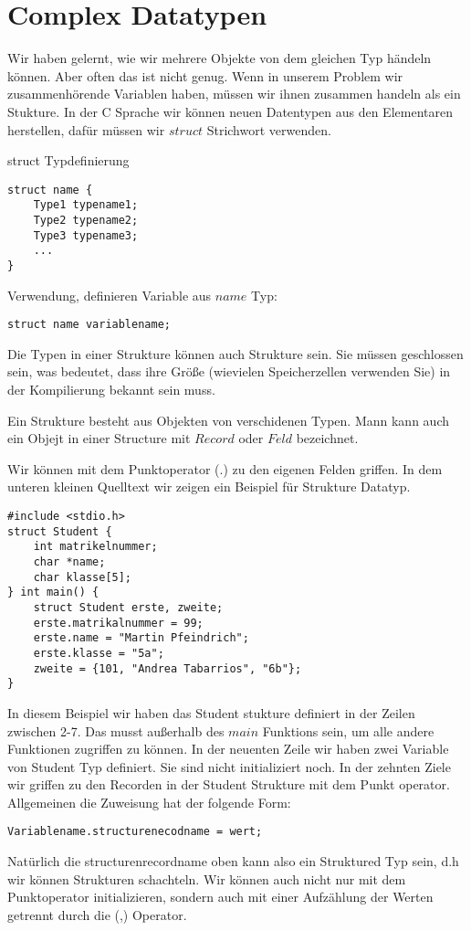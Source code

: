 \section{Complex Datatypen}
Wir haben gelernt, wie wir mehrere Objekte von dem gleichen Typ händeln
können. Aber often das ist nicht genug. Wenn in unserem Problem
wir zusammenhörende Variablen haben, müssen wir ihnen zusammen handeln
als ein Stukture. In der C Sprache wir können neuen Datentypen aus
den Elementaren herstellen, dafür müssen wir $struct$ Strichwort
verwenden.
\begin{myalertblock}{struct Typdefinierung}
\begin{lstlisting}
struct name {
    Type1 typename1;
    Type2 typename2;
    Type3 typename3;
    ...
}
\end {lstlisting}
\vspace{-0.4cm}
Verwendung, definieren Variable aus $name$ Typ:
\begin{lstlisting}
struct name variablename;
\end{lstlisting}
\vspace{-0.4cm} 
Die Typen in einer Strukture können auch Strukture sein.
Sie müssen geschlossen sein, was bedeutet, dass ihre Größe
(wievielen Speicherzellen verwenden Sie) in der Kompilierung
bekannt sein muss.
\end{myalertblock}
Ein Strukture besteht aus Objekten von verschidenen Typen. 
Mann kann auch ein Objejt in einer Structure mit $Record$ 
oder $Feld$ bezeichnet.

Wir können mit dem Punktoperator (.) zu den eigenen Felden
griffen. In dem unteren kleinen Quelltext wir zeigen ein Beispiel
für Strukture Datatyp.
\begin{lstlisting}
#include <stdio.h>
struct Student {
    int matrikelnummer;
    char *name;
    char klasse[5];
} int main() {
    struct Student erste, zweite;
    erste.matrikalnummer = 99;
    erste.name = "Martin Pfeindrich";
    erste.klasse = "5a";
    zweite = {101, "Andrea Tabarrios", "6b"};
}
\end{lstlisting}
In diesem Beispiel wir haben das Student stukture definiert in der Zeilen zwischen 2-7.
Das musst außerhalb des $main$ Funktions sein, um alle andere Funktionen zugriffen zu können.
In der neuenten Zeile wir haben zwei Variable von Student Typ definiert. Sie sind 
nicht initializiert noch. In der zehnten Ziele wir griffen zu den Recorden in der
Student Strukture mit dem Punkt operator. Allgemeinen die Zuweisung hat der folgende Form:
\begin{lstlisting}
Variablename.structurenecodname = wert;
\end{lstlisting}
Natürlich die structurenrecordname oben kann also ein Struktured Typ sein, d.h wir können
Strukturen schachteln. Wir können auch nicht nur mit dem Punktoperator initializieren, sondern
auch mit einer Aufzählung der Werten getrennt durch die (,) Operator.

